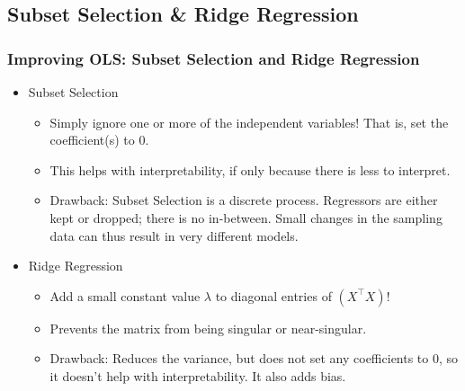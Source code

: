 \documentclass{beamer}
\begin{document}
\subsection{Subset Selection & Ridge Regression}
\frame
{
    \frametitle{Improving OLS: Subset Selection and Ridge Regression}
    
    \begin{itemize}
    \item<1->Subset Selection
        \begin{itemize}
          \item<2->Simply ignore one or more of the independent variables! That is, set the coefficient(s) to 0.
          \item<3->This helps with interpretability, if only because there is less to interpret.
          \item<4->Drawback: Subset Selection is a discrete process. Regressors are either kept or dropped; there is no in-between. Small changes in the sampling data can thus result in very different models.
        \end{itemize}
    \item<5->Ridge Regression
        \begin{itemize}
            \item<6->Add a small constant value $\lambda$ to diagonal entries of $(X^\intercal X)$!
            \item<7->Prevents the matrix from being singular or near-singular.
            \item<8-> Drawback: Reduces the variance, but does not set any coefficients to 0, so it doesn't help with interpretability. It also adds bias. 
        \end{itemize}
    \end{itemize}
}
\end{document}
